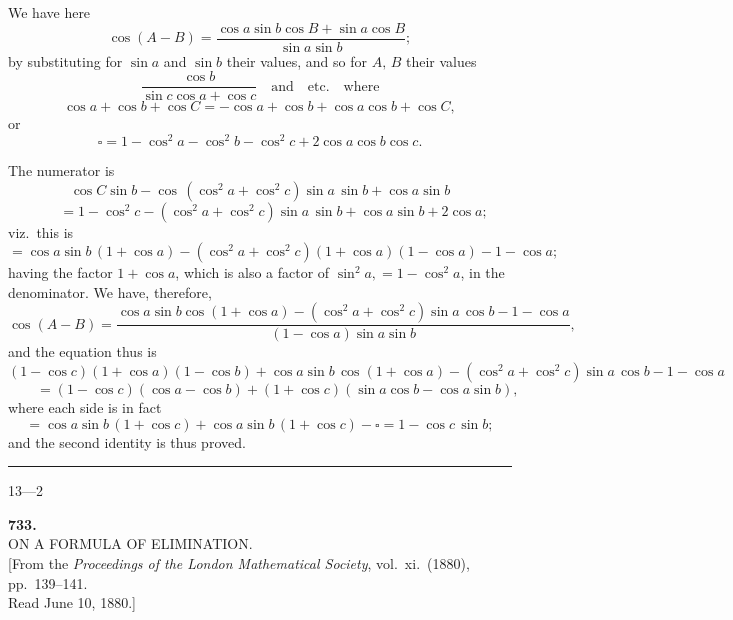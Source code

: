 \documentclass[11pt]{article}
\begin{document}
\medskip

\noindent
We have here
\[
\cos(A - B) = \frac{\cos a\sin b\cos B + \sin a\cos B}{\sin a\sin b};
\]
by substituting for $\sin a$ and $\sin b$ their values, and so for $A,\,B$ their values
\[
\frac{\cos b}{\sin c\cos a + \cos c}\quad\text{and}\quad\text{etc.}\quad\text{where}
\]
\[
\cos a + \cos b + \cos C = -\cos a + \cos b + \cos a\cos b + \cos C,
\]
or
\[
\square = 1 - \cos^2 a - \cos^2 b - \cos^2 c + 2\cos a\cos b\cos c.
\]

\newpage

\noindent
The numerator is
\[
\cos C\sin b - \cos\,(\cos^2 a + \cos^2 c)\sin a\,\sin b + \cos a\sin b
\]
\[
\qquad = 1 - \cos^2 c - (\cos^2 a + \cos^2 c)\sin a\,\sin b + \cos a\sin b + 2\cos a;
\]
viz.\ this is
\[
= \cos a\sin b\,(1 + \cos a) - (\cos^2 a + \cos^2 c)(1 + \cos a)(1 - \cos a) - 1 - \cos a;
\]
having the factor $1 + \cos a$, which is also a factor of $\sin^2 a, = 1 - \cos^2 a$, in the
denominator. We have, therefore,
\[
\cos(A - B) = \frac{\cos a\sin b\cos(1 + \cos a) - (\cos^2 a + \cos^2 c)\sin a\,\cos b - 1 - \cos a}{(1 - \cos a)\sin a\sin b},
\]
and the equation thus is
\[
(1 - \cos c)(1 + \cos a)(1 - \cos b) + \cos a\sin b\,\cos(1 + \cos a) - (\cos^2 a + \cos^2 c)\sin a\,\cos b - 1 - \cos a
\]
\[
\qquad = (1 - \cos c)(\cos a - \cos b) + (1 + \cos c)(\sin a\cos b - \cos a\sin b),
\]
where each side is in fact
\[
= \cos a\sin b\,(1 + \cos c) + \cos a\sin b\,(1 + \cos c) - \square = 1 - \cos c\,\sin b;
\]
and the second identity is thus proved.

\vfill

\begin{center}\rule{0.3\textwidth}{0.4pt}\end{center}

\hfill 13---2

\newpage

\begin{center}
\textbf{733.}\\[4pt]
\textsc{ON A FORMULA OF ELIMINATION.}\\[6pt]
\small[From the \textit{Proceedings of the London Mathematical Society}, vol.~xi.\ (1880), pp.~139--141.\\
Read June 10, 1880.]
\end{center}
\end{document}
